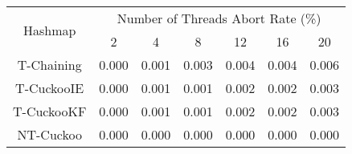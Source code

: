 \begin{tabular}{|c|c|c|c|c|c|c|}
\hline
\multirow{2}{*}{Hashmap} & \multicolumn{6}{c|}{Number of Threads Abort Rate (\%)}\\\cline{2-7}& 2 & 4 & 8 & 12 & 16 & 20\\
\hline
\hline
T-Chaining & 0.000 & 0.001 & 0.003 & 0.004 & 0.004 & 0.006\\
T-CuckooIE & 0.000 & 0.001 & 0.001 & 0.002 & 0.002 & 0.003\\
T-CuckooKF & 0.000 & 0.001 & 0.001 & 0.002 & 0.002 & 0.003\\
NT-Cuckoo & 0.000 & 0.000 & 0.000 & 0.000 & 0.000 & 0.000\\
\hline
\end{tabular}
